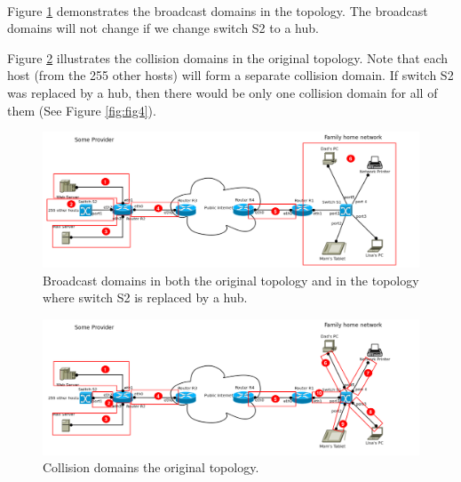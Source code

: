 \begin{tcolorbox}
    \mysolution{} \\
    Figure \ref{fig:fig2} demonstrates the broadcast domains in the topology.
    The broadcast domains will not change if we change switch S2 to a hub. 

    Figure \ref{fig:fig3} illustrates the collision domains in the original 
    topology. Note that each host (from the 255 other hosts) will form a separate 
    collision domain. If switch S2 was replaced by a hub, then there would be 
    only one collision domain for all of them (See Figure \ref{fig:fig4}).
\end{tcolorbox}

\begin{figure}[H]
    \begin{center}
        \includegraphics[scale=0.5]{fig2.pdf}
        \caption{Broadcast domains in both the original topology and in the topology
        where switch S2 is replaced by a hub.}
        \label{fig:fig2}
    \end{center}
\end{figure}

\begin{figure}[H]
    \begin{center}
        \includegraphics[scale=0.5]{fig3.pdf}
        \caption{Collision domains the original topology.}
        \label{fig:fig3}
    \end{center}
\end{figure}

